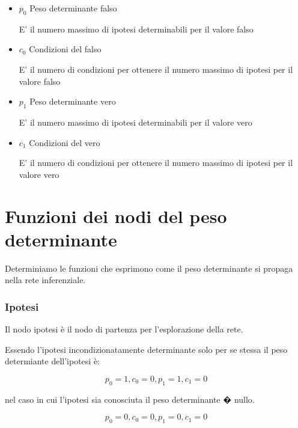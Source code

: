 \documentclass{article}
\begin{document}
  \begin{itemize}
  
  \item
    $p_{0}$ Peso determinante falso
    
    E' il numero massimo di ipotesi determinabili per il valore falso
    
  \item
    $c_{0}$ Condizioni del falso
    
    E' il numero di condizioni per ottenere il numero massimo di ipotesi per il
    valore falso
    
  \item
    $p_{1}$ Peso determinante vero
    
    E' il numero massimo di ipotesi determinabili per il valore vero
    
  \item
    $c_{1}$ Condizioni del vero
    
    E' il numero di condizioni per ottenere il numero massimo di ipotesi per il
    valore vero
    
  \end{itemize}
  
  \part{Funzioni dei nodi del peso determinante}
  
  Determiniamo le funzioni che esprimono come il peso determinante si propaga
  nella rete inferenziale.
  
  \section{Ipotesi}
  
  Il nodo ipotesi \`e il nodo di partenza per l'esplorazione della rete.
  
  Essendo l'ipotesi incondizionatamente determinante solo per se stessa il peso
  determiante dell'ipotesi \`e:
  
  \begin{equation}
      p_0=1, c_0=0, p_1=1, c_1=0
  \end{equation}

  nel caso in cui l'ipotesi sia conosciuta il peso determinante � nullo.
  
  \begin{equation}
      p_0=0, c_0=0, p_1=0, c_1=0
  \end{equation}
\end{document}
